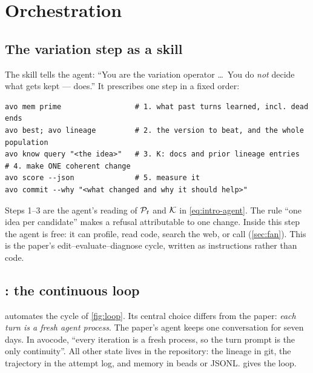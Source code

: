\section{Orchestration}
\label{sec:orchestration}

\subsection{The variation step as a skill}

The  skill tells the agent: ``You are the variation operator \ldots\ You do
\emph{not} decide what gets kept ---  does.'' It prescribes one step in a fixed order:
\begin{lstlisting}
avo mem prime                 # 1. what past turns learned, incl. dead ends
avo best; avo lineage         # 2. the version to beat, and the whole population
avo know query "<the idea>"   # 3. K: docs and prior lineage entries
# 4. make ONE coherent change
avo score --json              # 5. measure it
avo commit --why "<what changed and why it should help>"
\end{lstlisting}
Steps 1--3 are the agent's reading of $\mathcal{P}_t$ and $\mathcal{K}$ in \cref{eq:intro-agent}. The rule ``one idea
per candidate'' makes a refusal attributable to one change. Inside this step the agent is free: it
can profile, read code, search the web, or call  (\cref{sec:fan}). This is the paper's
edit--evaluate--diagnose cycle, written as instructions rather than code.

\subsection{\texorpdfstring{}{avo run}: the continuous loop}
\label{sec:run}

 automates the cycle of \cref{fig:loop}. Its central choice differs from the paper:
\emph{each turn is a fresh agent process}. The paper's agent keeps one conversation for seven days.
In avocode, ``every iteration is a fresh process, so the turn prompt is the only continuity''. All
other state lives in the repository: the lineage in git, the trajectory in the attempt log, and
memory in beads or JSONL.  gives the loop.

